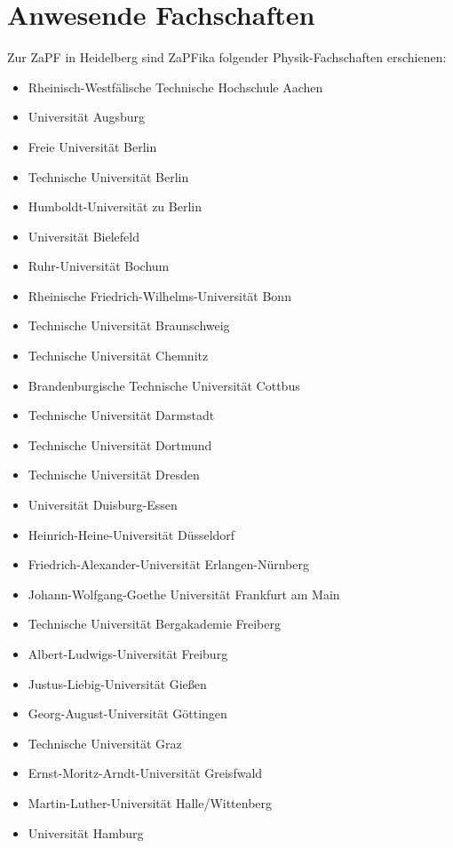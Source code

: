 \section{Anwesende Fachschaften}
  Zur ZaPF in Heidelberg sind ZaPFika folgender Physik-Fachschaften erschienen:
  \begin{itemize}
    \item Rheinisch-Westfälische Technische Hochschule Aachen
    \item Universität Augsburg
    \item Freie Universität Berlin
    \item Technische Universität Berlin
    \item Humboldt-Universität zu Berlin
    \item Universität Bielefeld
    \item Ruhr-Universität Bochum
    \item Rheinische Friedrich-Wilhelms-Universität Bonn
    \item Technische Universität Braunschweig
    \item Technische Universität Chemnitz
    \item Brandenburgische Technische Universität Cottbus
    \item Technische Universität Darmstadt
    \item Technische Universität Dortmund
    \item Technische Universität Dresden
    \item Universität Duisburg-Essen
    \item Heinrich-Heine-Universität Düsseldorf
    \item Friedrich-Alexander-Universität Erlangen-Nürnberg
    \item Johann-Wolfgang-Goethe Universität Frankfurt am Main
    \item Technische Universität Bergakademie Freiberg
    \item Albert-Ludwigs-Universität Freiburg
    \item Justus-Liebig-Universität Gießen
    \item Georg-August-Universität Göttingen
    \item Technische Universität Graz
    \item Ernst-Moritz-Arndt-Universität Greisfwald
    \item Martin-Luther-Universität Halle/Wittenberg
    \item Universität Hamburg

\end{itemize}

